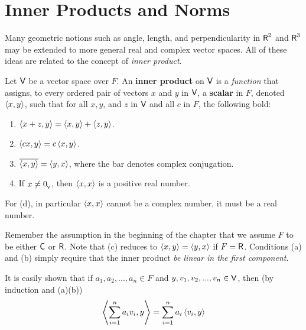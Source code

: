 \section{Inner Products and Norms} \label{sec 6.1}

Many geometric notions such as angle, length, and perpendicularity in \(\textsf{R}^2\) and \(\textsf{R}^3\) may be extended to more general real and complex vector spaces.
All of these ideas are related to the concept of \emph{inner product}.

\begin{definition} \label{def 6.1}
Let \(\textsf{V}\) be a vector space over \(F\).
An \textbf{inner product} on \(\textsf{V}\) is a \emph{function} that assigns, to every ordered pair of vectors \(x\) and \(y\) in \(\textsf{V}\), a \textbf{scalar} in \(F\), denoted \(\left< x, y \right>\), such that for all \(x, y\), and \(z\) in \(\textsf{V}\) and all \(c\) in \(F\), the following bold:
\begin{enumerate}
\item \(\left< x + z, y \right> = \left< x, y \right> + \left< z, y \right>\).
\item \(\left< cx, y \right> = c \left< x, y \right>\).
\item \(\overline{\left< x, y \right>} = \left< y, x \right>\), where the bar denotes complex conjugation.
\item If \(x \ne 0_{_{\textsf{V}}}\), then \(\left< x, x \right>\) is a positive real number.
\end{enumerate}
\end{definition}

\begin{note}
For (d), in particular \(\left< x, x \right>\) cannot be a complex number, it must be a real number.
\end{note}

\begin{remark} \label{remark 6.1.1}
Remember the assumption in the beginning of the chapter that we assume \(F\) to be either \(\textsf{C}\) or \(\textsf{R}\).
Note that (c) reduces to \(\left< x, y \right> = \left< y, x \right>\) if \(F = \textsf{R}\).
Conditions (a) and (b) simply require that the inner product \emph{be linear in the first component}.

It is easily shown that if \(a_1, a_2, ..., a_n \in F\) and \(y, v_1, v_2, ..., v_n \in \textsf{V}\), then (by induction and (a)(b))
\[
    \left< \sum_{i = 1}^n a_i v_i, y \right> = \sum_{i = 1}^n a_i \left< v_i, y \right>
\]
\end{remark}

